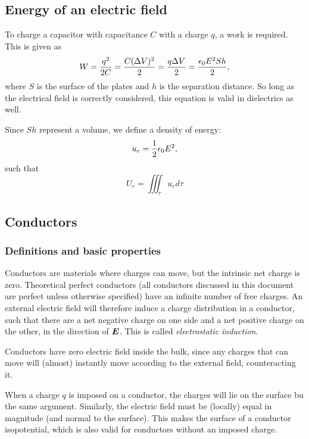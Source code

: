 \subsection{Energy of an electric field}
    To charge a capacitor with capacitance $C$ with a charge $q$, a work is required. This is given as 
    \begin{equation}
        W = \frac{q^2}{2C} = \frac{C(\Delta V)^2}{2} = \frac{q\Delta V}{2} = \frac{\epsilon_0 E^2S h}{2},
    \end{equation}
    where $S$ is the surface of the plates and $h$ is the separation distance. 
    So long as the electrical field is correctly considered, this equation is valid in dielectrics as well.
    
    Since $S h$ represent a volume, we define a density of energy: 
    \begin{equation}
        u_e = \frac{1}{2}\epsilon_0 E^2, 
    \end{equation}
    such that 
    \begin{equation}
        U_e = \iiint_\tau u_e d\tau
    \end{equation}
    
\subsection{Conductors}
    \subsubsection{Definitions and basic properties}
        Conductors are materials where charges can move, but the intrinsic net charge is zero. 
        Theoretical perfect conductors (all conductors discussed in this document are perfect unless otherwise specified) 
        have an infinite number of free charges. 
        An external electric field will therefore induce a charge distribution in a conductor, 
        such that there are a net negative charge on one side and a net positive charge on the other, 
        in the direction of $\bm{E}$. This is called \textit{electrostatic induction}.
        
        Conductors have zero electric field inside the bulk, 
        since any charges that can move will (almost) instantly move according to the external field, counteracting it. 
        
        When a charge $q$ is imposed on a conductor, the charges will lie on the surface bu the same argument. 
        Similarly, the electric field must be (locally) equal in magnitude (and normal to the surface). 
        This makes the surface of a conductor isopotential, which is also valid for conductors without an imposed charge. 

